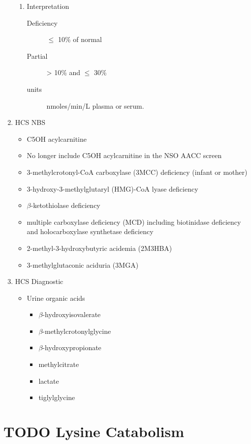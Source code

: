 \documentclass{scrartcl}
\begin{document}
\begin{enumerate}
\begin{enumerate}
\item Interpretation
\label{sec:org1d21cb3}
\begin{description}
\item[{Deficiency}] \(\le\) 10\% of normal
\item[{Partial}] \textgreater{} 10\% and \(\le\) 30\%
\item[{units}] nmoles/min/L plasma or serum.
\end{description}
\end{enumerate}

\item HCS NBS
\label{sec:org7d8d72b}
\begin{itemize}
\item C5OH acylcarnitine
\item No longer include C5OH acylcarnitine in the NSO AACC screen
\item 3-methylcrotonyl-CoA carboxylase (3MCC) deficiency (infant or mother)
\item 3-hydroxy-3-methylglutaryl (HMG)-CoA lyase deficiency
\item \(\beta\)-ketothiolase deficiency
\item multiple carboxylase deficiency (MCD) including biotinidase deficiency and holocarboxylase synthetase deficiency
\item 2-methyl-3-hydroxybutyric acidemia (2M3HBA)
\item 3-methylglutaconic aciduria (3MGA)
\end{itemize}

\item HCS Diagnostic
\label{sec:org7a00ec3}

\begin{itemize}
\item Urine organic acids
\begin{itemize}
\item \(\beta\)-hydroxyisovalerate
\item \(\beta\)-methylcrotonylglycine
\item \(\beta\)-hydroxypropionate
\item methylcitrate
\item lactate
\item tiglylglycine
\end{itemize}
\end{itemize}
\end{enumerate}


\section{{\bfseries\sffamily TODO} Lysine Catabolism}
\label{sec:org9d5e6d0}
\end{document}
